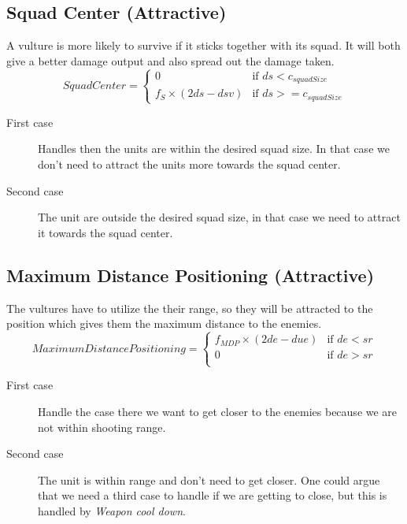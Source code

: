 	\subsection{Squad Center (Attractive)}
		\label{SCA_label}A vulture is more likely to survive if it sticks together with its squad. 
		It will both give a better damage output and also spread out the damage taken.
		\begin{displaymath}
			SquadCenter  = \begin{cases}
					0 & \text{if } ds < c_{squadSize} \\
					f_{S} \times (2ds - dsv) & \text{if } ds >= c_{squadSize}
				\end{cases}		
		\end{displaymath}
		
		\begin{description}
			\item[First case] Handles then the units are within the desired squad size. In that case we don't need to attract the units more towards the squad center.
			\item[Second case] The unit are outside the desired squad size, in that case we need to attract it towards the squad center.
		\end{description}
	\subsection{Maximum Distance Positioning (Attractive)}
		The vultures have to utilize the their range, so they will be attracted to the position which gives them the maximum distance to the enemies.
		\begin{displaymath}
			MaximumDistancePositioning = \begin{cases}
					f_{MDP} \times (2de - due) & \text{if } de < sr\\
					0 & \text{if } de > sr\\
				\end{cases}		
		\end{displaymath}
		\begin{description}
			\item[First case] Handle the case there we want to get closer to the enemies because we are not within shooting range.
			\item[Second case] The unit is within range and don't need to get closer. One could argue that we need a third case to handle if we are getting to close, but this is handled by \textit{Weapon cool down}.
		\end{description}
